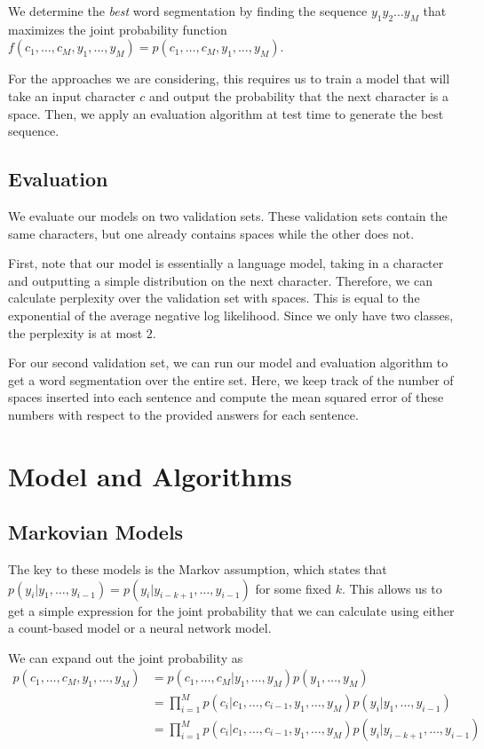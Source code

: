 \documentclass[11pt]{article}
\begin{document}
We determine the \emph{best} word segmentation by finding the sequence $y_1y_2\dots y_M$ that maximizes the joint probability function $f(c_1, \dots, c_M, y_1, \dots, y_M) = p(c_1, \dots, c_M, y_1, \dots, y_M)$. 

For the approaches we are considering, this requires us to train a model that will take an input character $c$ and output the probability that the next character is a space. Then, we apply an evaluation algorithm at test time to generate the best sequence. 

\subsection{Evaluation}

We evaluate our models on two validation sets. These validation sets contain the same characters, but one already contains spaces while the other does not. 

First, note that our model is essentially a language model, taking in a character and outputting a simple distribution on the next character. Therefore, we can calculate perplexity over the validation set with spaces. This is equal to the exponential of the average negative log likelihood. Since we only have two classes, the perplexity is at most $2$. 

For our second validation set, we can run our model and evaluation algorithm to get a word segmentation over the entire set. Here, we keep track of the number of spaces inserted into each sentence and compute the mean squared error of these numbers with respect to the provided answers for each sentence. 

\section{Model and Algorithms}

\subsection{Markovian Models}

The key to these models is the Markov assumption, which states that $p(y_i | y_1, \dots, y_{i-1}) = p(y_i | y_{i-k+1}, \dots, y_{i-1})$ for some fixed $k$. This allows us to get a simple expression for the joint probability that we can calculate using either a count-based model or a neural network model. 

We can expand out the joint probability as 
\begin{align*}
  p(c_1, \dots, c_M, y_1, \dots, y_M) &= p(c_1, \dots, c_M | y_1, \dots, y_M)p(y_1, \dots, y_M) \\
  &= \prod_{i=1}^M p(c_i | c_1, \dots, c_{i-1}, y_1, \dots, y_M)p(y_i | y_1, \dots, y_{i-1}) \\ 
  &= \prod_{i=1}^M p(c_i | c_1, \dots, c_{i-1}, y_1, \dots, y_M)p(y_i | y_{i-k+1}, \dots, y_{i-1}) \\
\end{align*}
\end{document}
